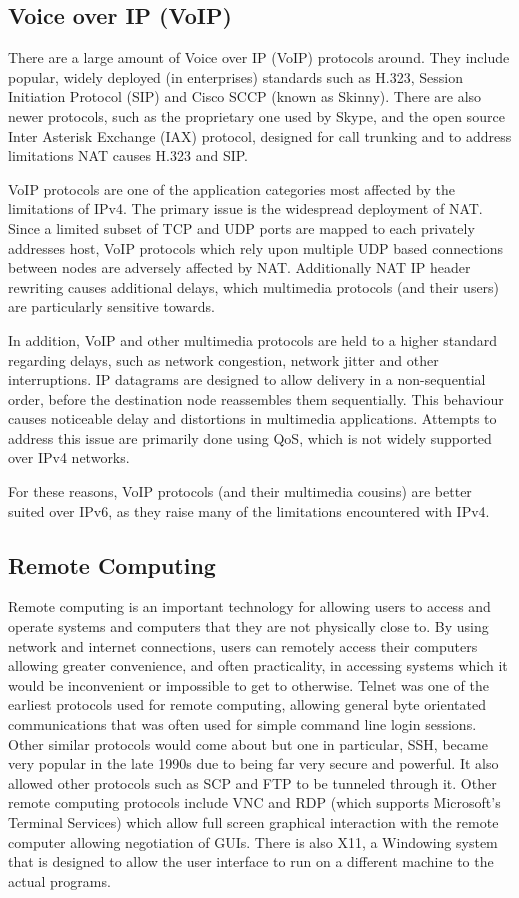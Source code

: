 \documentclass[a4paper,12pt]{article}
\begin{document}
\subsection{Voice over IP (VoIP)}

There are a large amount of Voice over IP (VoIP) protocols around. They
include popular, widely deployed (in enterprises) standards such as 
H.323, Session Initiation Protocol (SIP) and Cisco SCCP (known as
Skinny). There are also newer protocols, such as the proprietary one used
by Skype, and the open source Inter Asterisk Exchange (IAX) protocol,
designed for call trunking and to address limitations NAT causes H.323
and SIP.


VoIP protocols are one of the application categories most affected by
the limitations of IPv4. The primary issue is the widespread deployment
of NAT. Since a limited subset of TCP and UDP ports are mapped to each
privately addresses host, VoIP protocols which rely upon multiple UDP
based connections between nodes are adversely affected by NAT.
Additionally NAT IP header rewriting causes additional delays, which 
multimedia protocols (and their users) are particularly sensitive 
towards.


In addition, VoIP and other multimedia protocols are held to a higher
standard regarding delays, such as network congestion, network jitter 
and other interruptions. IP datagrams are designed to allow delivery 
in a non-sequential order, before the destination node reassembles them
sequentially. This behaviour causes noticeable delay and distortions in 
multimedia applications. Attempts to address this issue are primarily
done using QoS, which is not widely supported over IPv4 networks.


For these reasons, VoIP protocols (and their multimedia cousins) are
better suited over IPv6, as they raise many of the limitations
encountered with IPv4. 

\subsection{Remote Computing}

Remote computing is an important technology for allowing users to access
and operate systems and computers that they are not physically close to. 
By using network and internet connections, users can remotely access 
their computers allowing greater convenience, and often practicality, in
accessing systems which it would be inconvenient or impossible to get to  
otherwise. Telnet was one of the earliest protocols used for remote 
computing, allowing general byte orientated communications that was 
often used for simple command line login sessions. Other similar 
protocols would come about but one in particular, SSH, became  very 
popular in the late 1990s due to being far very secure and powerful. 
It also allowed other protocols such as SCP and FTP to be tunneled
through it. Other remote computing protocols include VNC and RDP (which
supports Microsoft's Terminal Services) which allow full screen
graphical interaction with the remote computer allowing negotiation of 
GUIs. There is also X11, a Windowing system that is designed to allow 
the user interface to run on a different machine to the actual programs. 
\end{document}
